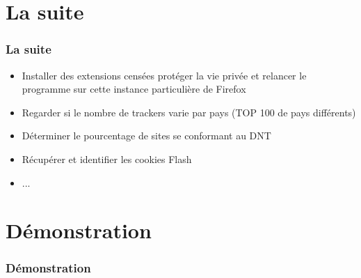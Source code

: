 \documentclass{beamer}
\begin{document}
  \section{La suite}
  \begin{frame}
  \frametitle{La suite}
    \begin{itemize}
      \item Installer des extensions censées protéger la vie privée et relancer le programme sur cette instance particulière de Firefox 
      \item Regarder si le nombre de trackers varie par pays (TOP 100 de pays différents)
      \item Déterminer le pourcentage de sites se conformant au DNT
      \item Récupérer et identifier les cookies Flash
      \item ...
    \end{itemize}
  \end{frame}
  
  \section{Démonstration}
  \begin{frame}
  \frametitle{Démonstration}
  \end{frame}

  
\end{document}
